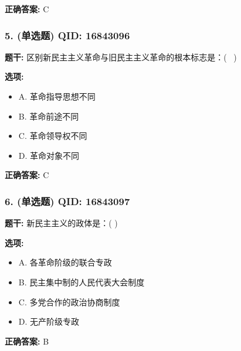 \documentclass[12pt,UTF8]{ctexart}
\begin{document}
\textbf{正确答案:}
C

\vspace{0.3em}\hrulefill\vspace{0.7em}

\subsubsection*{5. (单选题) \small QID: 16843096}

\textbf{题干:}
区别新民主主义革命与旧民主主义革命的根本标志是：(  )

\textbf{选项:}
\begin{itemize}[leftmargin=*]

  \item A. 革命指导思想不同

  \item B. 革命前途不同

  \item C. 革命领导权不同

  \item D. 革命对象不同

\end{itemize}

\textbf{正确答案:}
C

\vspace{0.3em}\hrulefill\vspace{0.7em}

\subsubsection*{6. (单选题) \small QID: 16843097}

\textbf{题干:}
新民主主义的政体是：( )

\textbf{选项:}
\begin{itemize}[leftmargin=*]

  \item A. 各革命阶级的联合专政

  \item B. 民主集中制的人民代表大会制度

  \item C. 多党合作的政治协商制度

  \item D. 无产阶级专政

\end{itemize}

\textbf{正确答案:}
B

\vspace{0.3em}\hrulefill\vspace{0.7em}
\end{document}
